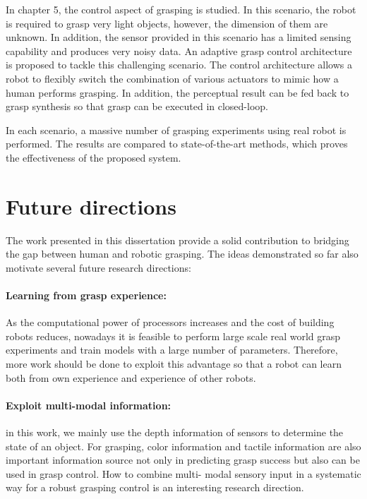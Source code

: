 In chapter 5, the control aspect of grasping is studied. In this scenario, the robot is required to grasp very light objects, however, the dimension of them are unknown. In addition, the sensor provided in this scenario has a limited sensing capability and produces very noisy data.  An adaptive grasp control architecture is proposed to tackle this challenging scenario. The control architecture allows a robot to flexibly switch the combination of various actuators to mimic how a human performs grasping.  In addition, the perceptual result can be fed back to grasp synthesis so that grasp can be executed in closed-loop. 

In each scenario, a massive number of grasping experiments using real robot is performed. The results are compared to state-of-the-art methods, which proves the effectiveness of the proposed system. 

\section{Future directions}
The work presented in this dissertation provide a solid contribution to bridging the gap between human and robotic grasping. The ideas demonstrated so far also motivate several future research directions:  

\paragraph{Learning from grasp experience:}
As the computational power of processors increases and the cost of building robots reduces, nowadays it is feasible to perform large scale real world grasp experiments and train models with a large number of parameters. Therefore, more work should be done to exploit this advantage so that a robot can learn both from own experience and  experience of other robots. 

\paragraph{Exploit multi-modal information: }

in this work, we mainly use the depth information of sensors to determine the state of an object. For grasping, color information and tactile information are also important information source not only in predicting grasp success but also can be used in grasp control. How to combine multi- modal sensory input in a systematic way for a robust grasping control is an interesting research direction. 

